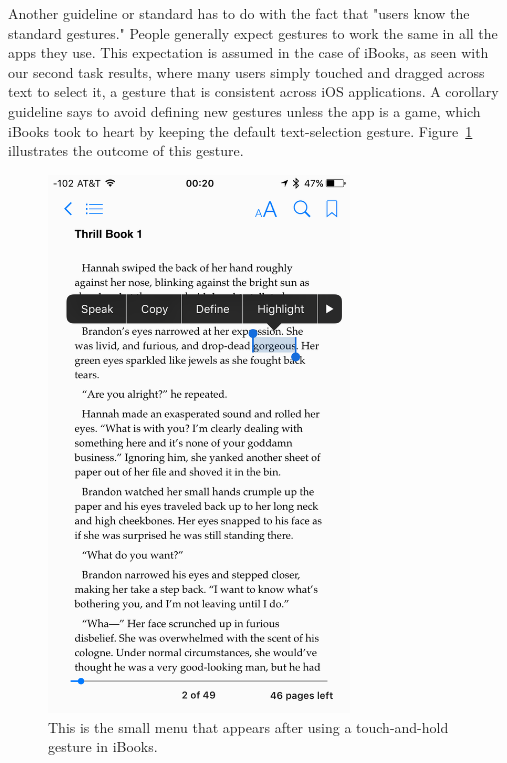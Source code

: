 \documentclass[journal, a4paper]{IEEEtran}
\begin{document}
    Another guideline or standard has to do with the fact that "users know the standard gestures." People generally expect gestures to work the same in all the apps they use. This expectation is assumed in the case of iBooks, as seen with our second task results, where many users simply touched and dragged across text to select it, a gesture that is consistent across iOS applications. A corollary guideline says to avoid defining new gestures unless the app is a game, which iBooks took to heart by keeping the default text-selection gesture. Figure~\ref{fig:ibooksHighlight} illustrates the outcome of this gesture.
    
    \begin{figure}[!hbt]
		\begin{center}
		\includegraphics[width=8cm]{ibooksHighlight}
		\caption{This is the small menu that appears after using a touch-and-hold gesture in iBooks.}
		\label{fig:ibooksHighlight}
		\end{center}
	\end{figure}
    
\end{document}
